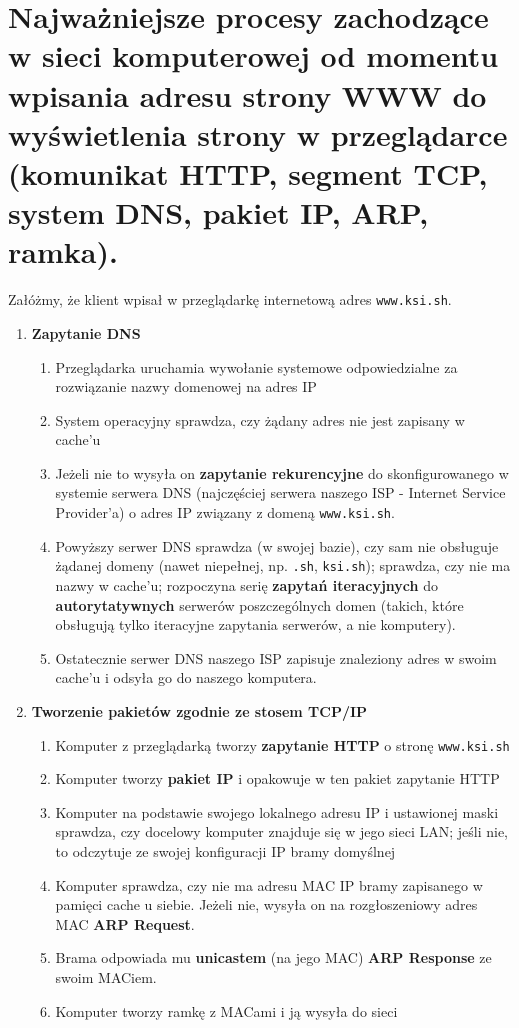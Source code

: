 \documentclass[main.tex]{subfiles}
\begin{document}
    \section{Najważniejsze procesy zachodzące w sieci komputerowej od momentu wpisania adresu strony WWW do wyświetlenia strony w przeglądarce (komunikat HTTP, segment TCP, system DNS, pakiet IP, ARP, ramka).}
    Załóżmy, że klient wpisał w przeglądarkę internetową adres \texttt{www.ksi.sh}.
    \begin{enumerate}
        \item \textbf{Zapytanie DNS}
        \begin{enumerate}[noitemsep]
            \item Przeglądarka uruchamia wywołanie systemowe odpowiedzialne za rozwiązanie nazwy domenowej na adres IP
            \item System operacyjny sprawdza, czy żądany adres nie jest zapisany w cache'u
            \item Jeżeli nie to wysyła on \textbf{zapytanie rekurencyjne} do skonfigurowanego w systemie serwera DNS
            (najczęściej serwera naszego ISP - Internet Service Provider'a) o adres IP związany z domeną \texttt{www.ksi.sh}.
            \item Powyższy serwer DNS sprawdza (w swojej bazie), czy sam nie obsługuje żądanej domeny (nawet niepełnej, np.
            \texttt{.sh}, \texttt{ksi.sh}); sprawdza, czy nie ma nazwy w cache'u; rozpoczyna serię \textbf{zapytań
            iteracyjnych} do \textbf{autorytatywnych} serwerów
            poszczególnych domen (takich, które obsługują tylko iteracyjne zapytania serwerów, a nie komputery).
            \item Ostatecznie serwer DNS naszego ISP zapisuje znaleziony adres w swoim cache'u i odsyła go do naszego
            komputera.
        \end{enumerate}

        \item \textbf{Tworzenie pakietów zgodnie ze stosem TCP/IP}
        \begin{enumerate}[noitemsep]
            \item Komputer z przeglądarką tworzy \textbf{zapytanie HTTP} o stronę \texttt{www.ksi.sh}
            \item Komputer tworzy \textbf{pakiet IP} i opakowuje w ten pakiet zapytanie HTTP
            \item Komputer na podstawie swojego lokalnego adresu IP i ustawionej maski sprawdza, czy docelowy komputer
            znajduje się w jego sieci LAN; jeśli nie, to odczytuje ze swojej konfiguracji IP bramy domyślnej
            \item Komputer sprawdza, czy nie ma adresu MAC IP bramy zapisanego w pamięci cache u siebie.
            Jeżeli nie, wysyła on na rozgłoszeniowy adres MAC \textbf{ARP Request}.
            \item Brama odpowiada mu \textbf{unicastem} (na jego MAC) \textbf{ARP Response} ze swoim MACiem.
            \item Komputer tworzy ramkę z MACami i ją wysyła do sieci
        \end{enumerate}


\end{enumerate}
\end{document}
